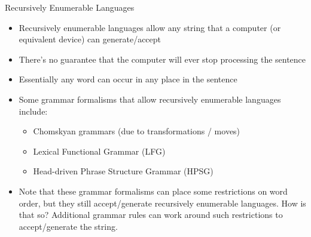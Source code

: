 \documentclass{beamer}
\begin{document}
\begin{frame}{Recursively Enumerable Languages}
\begin{block}{}
\begin{itemize}
	\item Recursively enumerable languages allow any string that a computer (or equivalent device) can generate/accept
	\item There's no guarantee that the computer will ever stop processing the sentence
	\item Essentially any word can occur in any place in the sentence
	\pause
	\item Some grammar formalisms that allow recursively enumerable languages include:
	\begin{itemize}
		\item Chomskyan grammars (due to transformations / moves)
		\item Lexical Functional Grammar (LFG)
		\item Head-driven Phrase Structure Grammar (HPSG)
	\end{itemize}
	\pause
	\item Note that these grammar formalisms can place some restrictions on word order, but they still accept/generate recursively enumerable languages. \pause How is that so? \pause Additional grammar rules can work around such restrictions to accept/generate the string.
\end{itemize}
\end{block}
\end{frame}



\end{document}
